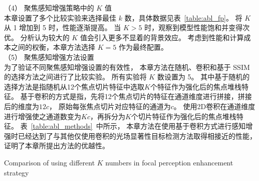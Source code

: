 （4）
聚焦感知增强策略中的 $K$ 值
\\
%
%
%
%
\indent
本章设置了多个比较实验来选择最佳 $k$ 数，具体数据见表~\ref{table:abl_fp}。
将 $K$ 从 1 增加到 5 时，性能逐渐提高。 
当 $K > 5$ 时，观察到模型性能饱和并变得次优。 
分析认为较大的 $K$ 值会引入更多不显着的背景效应。 
考虑到性能和计算成本之间的权衡，本章方法选择 $K = 5$ 作为最终配置。
\\
%
%
%
%
\indent
（5）
聚焦感知增强方法设置
\\
%
%
%
%
\indent
为了验证不同聚焦感知增强设置的有效性，
本章方法在随机、卷积和基于 SSIM 的选择方法之间进行了比较实验。 
所有实验将 $K$ 数设置为 5。
其中基于随机的选择方法是指随机从12个焦点切片特征中选取$K$个特征作为强化后的焦点堆栈特征。
基于卷积的方式是指，先将12个焦点切片的特征在通道维度进行拼接，拼接后的维度为$12c$，
原始每张焦点切片对应特征的通道为$c$。
使用2D卷积在通道维度进行增强使之通道数变为$Kc$，再拆分为$K$个切片特征作为强化后的焦点堆栈特征。
表~\ref{table:abl_methods}~中所示，
本章方法在使用基于卷积方式进行感知增强时已经达到了与其他仅使用卷积的光场显著性目标检测方法取得相接近的性能，
证明了本章所提出方法的优越性。
\begin{table}[t]
	{Comparison of using different $K$ numbers in focal perception enhancement strategy}
	\centering
	\label{table:abl_fp}
\end{table}
